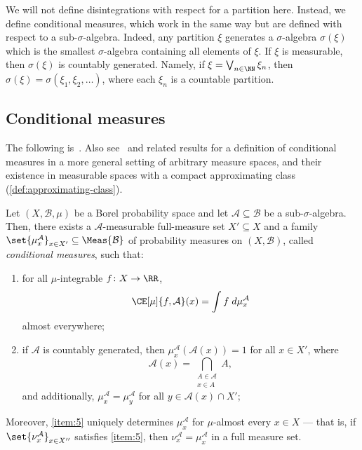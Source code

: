 \documentclass[../main]{subfiles}
\begin{document}
We will not define disintegrations with respect for a partition here. Instead, we define conditional measures, which work in the same way but are defined with respect to a sub-\(\sigma\)-algebra. Indeed, any partition \(\xi\) generates a \(\sigma\)-algebra \(\sigma(\xi)\) which is the smallest \(\sigma\)-algebra containing all elements of \(\xi\). If \(\xi\) is measurable, then \(\sigma(\xi)\) is countably generated. Namely, if \(\xi = \bigvee_{n \in \NN}\xi_n\), then \(\sigma(\xi) = \sigma(\xi_1,\xi_2,\dots)\), where each \(\xi_n\) is a countable partition.

\subsection{Conditional measures}

The following is~\cite[Theorem 5.14]{einsiedlerErgodicTheoryView2011}. Also see~\cite[Definition 10.4.1]{bogachevMeasureTheory2007} and related results for a definition of conditional measures in a more general setting of arbitrary measure spaces, and their existence in measurable spaces with a compact approximating class (\cref{def:approximating-class}).

\begin{theorem}
  Let \((X,\mathcal{B},\mu)\) be a Borel probability space and let \(\mathcal{A} \subseteq \mathcal{B}\) be a sub-\(\sigma\)-algebra. Then, there exists a \(\mathcal{A}\)-measurable full-measure set \(X' \subseteq X\) and a family \(\set{\mu^{\mathcal{A}}_x}_{x \in X'} \subseteq \Meas{\mathcal{B}}\) of probability measures on \((X,\mathcal{B})\), called \emph{conditional measures}, such that:
  \begin{enumerate}
  \item\label{item:5} for all \(\mu\)-integrable \(f \colon X \to \RR\),
    \begin{equation*}
      \CE[\mu]{f,\mathcal{A}}(x) = \int f \;d\mu_x^{\mathcal{A}}
    \end{equation*}
    almost everywhere;
  \item if \(\mathcal{A}\) is countably generated, then \(\mu^{\mathcal{A}}_x(\mathcal{A}(x)) = 1\) for all \(x \in X'\), where
    \begin{equation*}
      \mathcal{A}(x) = \bigcap_{\substack{A \in \mathcal{A} \\ x \in A}}A,
    \end{equation*}
    and additionally, \(\mu^{\mathcal{A}}_x = \mu^{\mathcal{A}}_y\) for all \(y \in \mathcal{A}(x) \cap X'\);
  \end{enumerate}
  Moreover, \cref{item:5} uniquely determines \(\mu^{\mathcal{A}}_x\) for \(\mu\)-almost every \(x \in X\) --- that is, if \(\set{\nu^{\mathcal{A}}_x}_{x \in X''}\) satisfies \cref{item:5}, then \(\nu^{\mathcal{A}}_x = \mu^{\mathcal{A}}_x\) in a full measure set.
\end{theorem}
\end{document}
